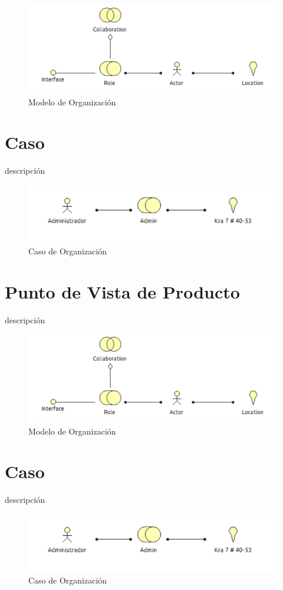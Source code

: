 
\begin{figure}[th!]
	\centering
	\includegraphics[width=0.7\linewidth]{arquitectura/negocio/imgs/m_organizacion}
	\caption{Modelo de Organización}
\end{figure}

\newpage
\section{Caso}
descripción

\begin{figure}[th!]
	\centering
	\includegraphics[width=0.7\linewidth]{arquitectura/negocio/imgs/c_organizacion}
	\caption{Caso de Organización}
\end{figure}
\newpage

\section{Punto de Vista de Producto}
descripción


\begin{figure}[th!]
	\centering
	\includegraphics[width=0.7\linewidth]{arquitectura/negocio/imgs/m_organizacion}
	\caption{Modelo de Organización}
\end{figure}

\newpage
\section{Caso}
descripción

\begin{figure}[th!]
	\centering
	\includegraphics[width=0.7\linewidth]{arquitectura/negocio/imgs/c_organizacion}
	\caption{Caso de Organización}
\end{figure}
\newpage